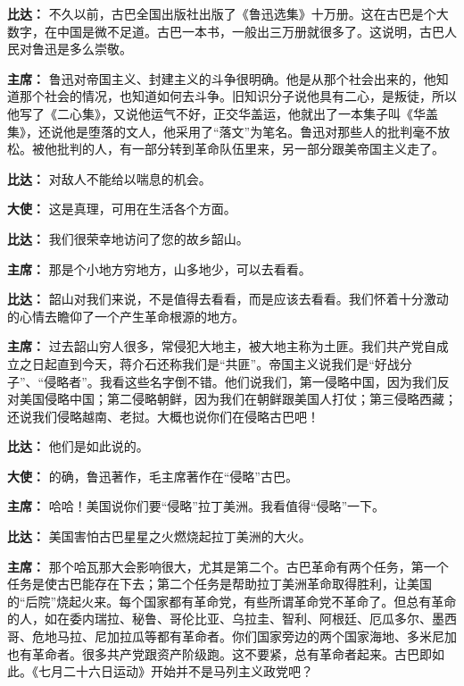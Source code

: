 \begin{duihua}
\item[\textbf{比达：}] 不久以前，古巴全国出版社出版了《鲁迅选集》十万册。这在古巴是个大数字，在中国是微不足道。古巴一本书，一般出三万册就很多了。这说明，古巴人民对鲁迅是多么崇敬。

\item[\textbf{主席：}] 鲁迅对帝国主义、封建主义的斗争很明确。他是从那个社会出来的，他知道那个社会的情况，也知道如何去斗争。旧知识分子说他具有二心，是叛徒，所以他写了《二心集》，又说他运气不好，正交华盖运，他就出了一本集子叫《华盖集》，还说他是堕落的文人，他采用了“落文”为笔名。鲁迅对那些人的批判毫不放松。被他批判的人，有一部分转到革命队伍里来，另一部分跟美帝国主义走了。

\item[\textbf{比达：}] 对敌人不能给以喘息的机会。

\item[\textbf{大使：}] 这是真理，可用在生活各个方面。

\item[\textbf{比达：}] 我们很荣幸地访问了您的故乡韶山。

\item[\textbf{主席：}] 那是个小地方穷地方，山多地少，可以去看看。

\item[\textbf{比达：}] 韶山对我们来说，不是值得去看看，而是应该去看看。我们怀着十分激动的心情去瞻仰了一个产生革命根源的地方。

\item[\textbf{主席：}] 过去韶山穷人很多，常侵犯大地主，被大地主称为土匪。我们共产党自成立之日起直到今天，蒋介石还称我们是“共匪”。帝国主义说我们是“好战分子”、“侵略者”。我看这些名字倒不错。他们说我们，第一侵略中国，因为我们反对美国侵略中国；第二侵略朝鲜，因为我们在朝鲜跟美国人打仗；第三侵略西藏；还说我们侵略越南、老挝。大概也说你们在侵略古巴吧！

\item[\textbf{比达：}] 他们是如此说的。

\item[\textbf{大使：}] 的确，鲁迅著作，毛主席著作在“侵略”古巴。

\item[\textbf{主席：}] 哈哈！美国说你们要“侵略”拉丁美洲。我看值得“侵略”一下。

\item[\textbf{比达：}] 美国害怕古巴星星之火燃烧起拉丁美洲的大火。

\item[\textbf{主席：}] 那个哈瓦那大会影响很大，尤其是第二个。古巴革命有两个任务，第一个任务是使古巴能存在下去；第二个任务是帮助拉丁美洲革命取得胜利，让美国的“后院”烧起火来。每个国家都有革命党，有些所谓革命党不革命了。但总有革命的人，如在委内瑞拉、秘鲁、哥伦比亚、乌拉圭、智利、阿根廷、厄瓜多尔、墨西哥、危地马拉、尼加拉瓜等都有革命者。你们国家旁边的两个国家海地、多米尼加也有革命者。很多共产党跟资产阶级跑。这不要紧，总有革命者起来。古巴即如此。《七月二十六日运动》开始并不是马列主义政党吧？


\end{duihua}
